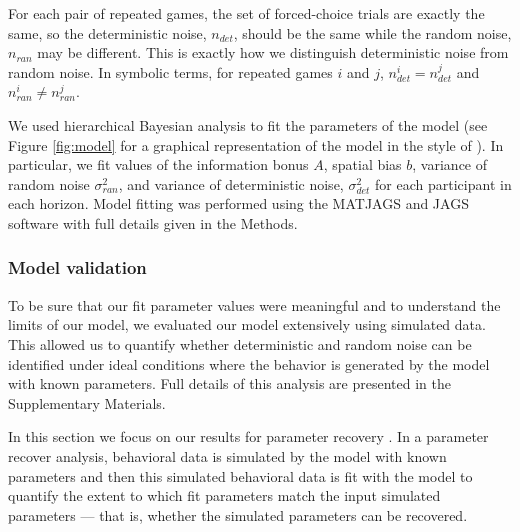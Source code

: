 \documentclass[12pt]{article}
\begin{document}
{%

For each pair of repeated games, the set of forced-choice trials are exactly the same, so the deterministic noise, $n_{det}$, should be the same while the random noise, $n_{ran}$ may be different. This is exactly how we distinguish deterministic noise from random noise. In symbolic terms, for repeated games $i$ and $j$,  $n_{det}^i=n_{det}^j$  and $n_{ran}^i \neq n_{ran}^j$.

We used hierarchical Bayesian analysis to fit the parameters of the model (see Figure \ref{fig:model} for a graphical representation of the model in the style of \cite{lee2014}). In particular, we fit values of the information bonus $A$, spatial bias $b$, variance of random noise $\sigma_{ran}^2$, and variance of deterministic noise, $\sigma_{det}^2$ for each participant in each horizon. Model fitting was performed using the MATJAGS and JAGS software \citep{jags, matjags} with full details given in the Methods.  

\subsubsection*{Model validation \label{ch:appendix:bayesrecovery}}
To be sure that our fit parameter values were meaningful and to understand the limits of our model, we evaluated our model extensively using simulated data. This allowed us to quantify whether deterministic and random noise can be identified under ideal conditions where the behavior is generated by the model with known parameters. Full details of this analysis are presented in the Supplementary Materials. 
	
In this section we focus on our results for parameter recovery \citep{Wilson2019}. In a parameter recover analysis, behavioral data is simulated by the model with known parameters and then this simulated behavioral data is fit with the model to quantify the extent to which fit parameters match the input simulated parameters --- that is, whether the simulated parameters can be recovered.  
	
}
\end{document}
